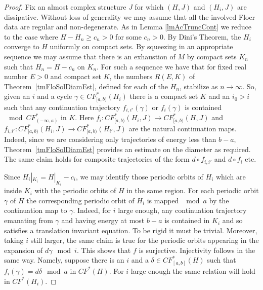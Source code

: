 \documentclass[11pt]{amsart}
\theoremstyle{definition}
\theoremstyle{remark}
\begin{document}
\begin{proof}
Fix an almost complex structure $J$ for which $(H,J)$ and $(H_i,J)$ are dissipative. Without loss of generality we may assume that all the involved Floer data are regular and non-degenerate. As in Lemma \ref{lmAcTruncCont} we reduce to the case where $H-H_n\geq c_n>0$ for some $c_n>0$. By Dini's Theorem, the $H_i$ converge to $H$ uniformly on compact sets. By squeezing in an appropriate sequence we may assume that there is an exhaustion of $M$ by compact sets $K_n$ such that  $H_n=H-c_n$ on $K_n$.  For such a sequence we have that for fixed real number $E>0$ and compact set $K$, the numbers $R(E,K)$ of Theorem~\ref{tmFloSolDiamEst}, defined for each of the $H_n$, stabilize as $n\to\infty$. So, given an $i$ and a cycle $\gamma\in CF^*_{[a,b)}(H_i)$  there is a compact set $K$ and an $i_0>i$  such that any continuation trajectory $f_{i,i'}(\gamma)$ or $f_i(\gamma)$  is contained $\mod CF^*_{(-\infty,a)}$ in $K$. Here $f_{i}:CF^*_{[a,b)}(H_{i},J)\to CF^*_{[a,b)}(H,J)$ and $f_{i,i'}:CF^*_{[a,b)}(H_{i},J)\to CF^*_{[a,b)}(H_{i'},J)$  are the natural continuation maps. Indeed, since we are considering only trajectories of energy less than $b-a,$  Theorem~\ref{tmFloSolDiamEst} provides an estimate on the diameter as required. The same claim holds for composite trajectories of the form $d\circ f_{i,i'}$ and $d\circ f_i$ etc.

Since $H_i|_{K_i}=H|_{K_i}-c_i$, we may identify those periodic orbits of $H_i$ which are inside $K_i$ with the periodic orbits of $H$ in the same region. For each periodic orbit $\gamma$ of $H$ the corresponding periodic orbit of $H_i$ is mapped $\mod a$ by the continuation map to $\gamma$.  Indeed, for $i$  large enough, any continuation trajectory emanating from $\gamma$ and having energy at most $b-a$ is contained in $K_i$ and so satisfies a translation invariant equation. To be rigid it must be trivial.  Moreover, taking $i$ still larger, the same claim is true for the periodic orbits appearing in the expansion of $d\gamma\mod i$. This shows that $f$ is surjective. Injectivity follows in the same way. Namely, suppose there is an $i$ and a $\delta\in CF^*_{[a,b]}(H)$ such that $f_i(\gamma)=d\delta\mod a$ in $CF^*(H)$. For $i$ large enough the same relation will hold in $CF^*(H_i)$.
%
\end{proof}
\end{document}
